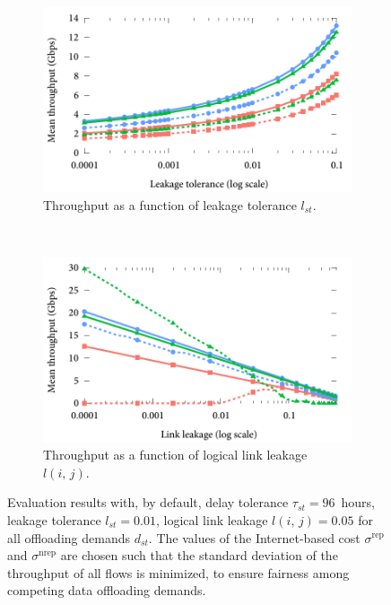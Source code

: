 \begin{figure}[!t]
    \begin{subfigure}[b]{0.50\textwidth}
        \centering
        \includegraphics[width=\textwidth]{results/leakageTolerance-ton.pdf}
        \caption{Throughput as a function of leakage tolerance $l_{st}$.}
        \label{fig:ton-leakageTolerance}
    \end{subfigure}%
    ~ %
    \begin{subfigure}[b]{0.50\textwidth}
        \centering
        \includegraphics[width=\textwidth]{results/linkLeakage-ton.pdf}
        \caption{Throughput as a function of logical link leakage $l(i,\,j)$.}
        \label{fig:ton-linkLeakage}
    \end{subfigure}
    \caption{Evaluation results with, by default, delay tolerance $\tau_{st} = 96$~hours, leakage tolerance $l_{st} = 0.01$, logical link leakage $l(i,\,j) = 0.05$ for all offloading demands $d_{st}$. The values of the Internet-based cost $\sigma^{\text{rep}}$ and $\sigma^{\text{nrep}}$ are chosen such that the standard deviation of the throughput of all flows is minimized, to ensure fairness among competing data offloading demands.}
    \label{fig:ton-evaluation}
\end{figure}

